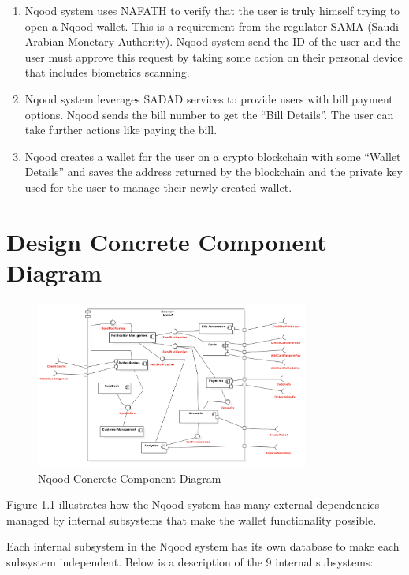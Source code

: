 \documentclass[a4paper]{report}
\begin{document}
\begin{enumerate}
\begin{enumerate}
              \item Nqood system uses NAFATH to verify that the user is truly himself trying to open a Nqood wallet. This is a requirement from the regulator SAMA (Saudi Arabian Monetary Authority). Nqood system send the ID of the user and the user must approve this request by taking some action on their personal device that includes biometrics scanning.
              \item Nqood system leverages SADAD services to provide users with bill payment options. Nqood sends the bill number to get the “Bill Details”. The user can take further actions like paying the bill.
              \item Nqood creates a wallet for the user on a crypto blockchain with some “Wallet Details” and saves the address returned by the blockchain and the private key used for the user to manage their newly created wallet.

          \end{enumerate}
\end{enumerate}

\chapter{Design Concrete Component Diagram}

\begin{figure}[h!]
    \centering
    \includegraphics[width=0.8\textwidth]{images/nqood-concrete-component-diagram.png}
    \caption{Nqood Concrete Component Diagram}
    \label{fig:concrete-diagram}
\end{figure}

Figure \ref{fig:concrete-diagram} illustrates how the Nqood system has many external dependencies managed by internal subsystems that make the wallet functionality possible.

Each internal subsystem in the Nqood system has its own database to make each subsystem independent. Below is a description of the 9 internal subsystems:
\end{document}
